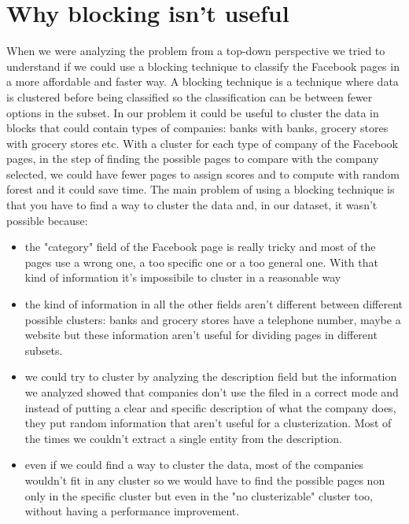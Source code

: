 \section{Why blocking isn't useful}
When we were analyzing the problem from a top-down perspective we tried to understand if we could use a blocking technique to classify the Facebook pages in a more affordable and faster way. A blocking technique is a technique where data is clustered before being classified so the classification can be between fewer options in the subset. In our problem it could be useful to cluster the data in blocks that could contain types of companies: banks with banks, grocery stores with grocery stores etc. With a cluster for each type of company of the Facebook pages, in the step of finding the possible pages to compare with the company selected, we could have fewer pages to assign scores and to compute with random forest and it could save time.
The main problem of using a blocking technique is that you have to find a way to cluster the data and, in our dataset, it wasn't possible because:
\begin{itemize}
\item the "category" field of the Facebook page is really tricky and most of the pages use a wrong one, a too specific one or a too general one. With that kind of information it's impossibile to cluster in a reasonable way
\item the kind of information in all the other fields aren't different between different possible clusters: banks and grocery stores have a telephone number, maybe a website but these information aren't useful for dividing pages in different subsets.
\item we could try to cluster by analyzing the description field but the information we analyzed showed that companies don't use the filed in a correct mode and instead of putting a clear and specific description of what the company does, they put random information that aren't useful for a clusterization. Most of the times we couldn't extract a single entity from the description.
\item even if we could find a way to cluster the data, most of the companies wouldn't fit in any cluster so we would have to find the possible pages non only in the specific cluster but even in the  "no clusterizable" cluster too, without having a performance improvement.
\end{itemize}


